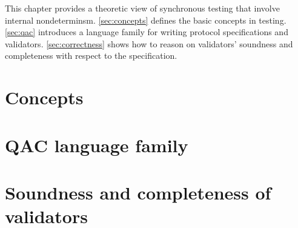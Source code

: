 This chapter provides a theoretic view of synchronous testing that involve
internal nondeterminsm.  \autoref{sec:concepts} defines the basic concepts in
testing.  \autoref{sec:qac} introduces a language family for writing protocol
specifications and validators.  \autoref{sec:correctness} shows how to reason on
validators' soundness and completeness with respect to the specification.

\section{Concepts}
\label{sec:concepts}


\section{QAC language family}
\label{sec:qac}


\section{Soundness and completeness of validators}
\label{sec:correctness}

